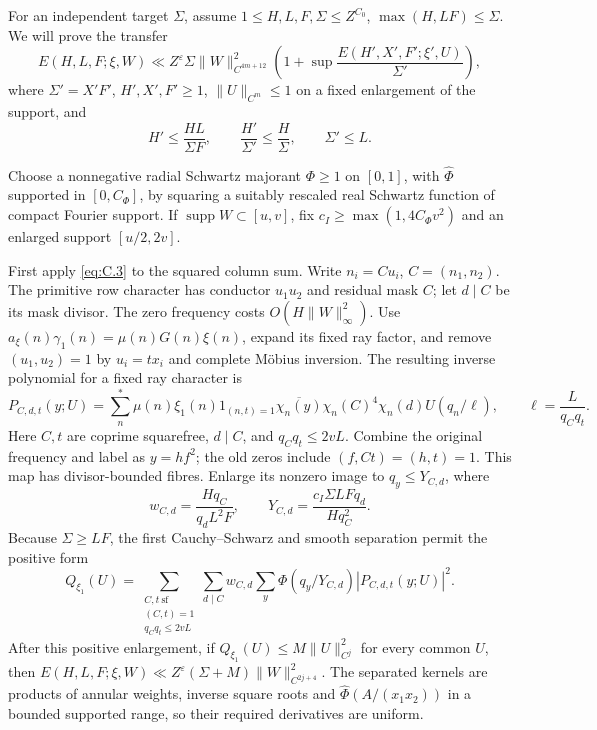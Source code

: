 \documentclass[11pt,a4paper]{article}
\begin{document}
For an independent target \(\Sigma\), assume \(1\le H,L,F,\Sigma\le Z^{C_0}\), \(\max(H,LF)\le\Sigma\). We will prove the transfer \[
E(H,L,F;\xi,W)
\ll Z^\varepsilon\Sigma\|W\|_{C^{4m+12}}^2
\left(1+\sup\frac{E(H',X',F';\xi',U)}{\Sigma'}\right),
\tag{C.8}\label{eq:C.8}
\] where \(\Sigma'=X'F'\), \(H',X',F'\ge1\), \(\|U\|_{C^m}\le1\) on a fixed enlargement of the support, and \[
H'\le\frac{HL}{\Sigma F},\qquad
\frac{H'}{\Sigma'}\le\frac H\Sigma,\qquad \Sigma'\le L.
\tag{C.9}\label{eq:C.9}
\]

Choose a nonnegative radial Schwartz majorant \(\Phi\ge1\) on \([0,1]\), with \(\widehat\Phi\) supported in \([0,C_\Phi]\), by squaring a suitably rescaled real Schwartz function of compact Fourier support. If \(\operatorname{supp}W\subset[u,v]\), fix \(c_I\ge\max(1,4C_\Phi v^2)\) and an enlarged support \([u/2,2v]\).

First apply \eqref{eq:C.3} to the squared column sum. Write \(n_i=Cu_i\), \(C=(n_1,n_2)\). The primitive row character has conductor \(u_1u_2\) and residual mask \(C\); let \(d\mid C\) be its mask divisor. The zero frequency costs \(O(H\|W\|_\infty^2)\). Use \(a_\xi(n)\gamma_1(n)=\mu(n)G(n)\xi(n)\), expand its fixed ray factor, and remove \((u_1,u_2)=1\) by \(u_i=tx_i\) and complete Möbius inversion. The resulting inverse polynomial for a fixed ray character is \[
P_{C,d,t}(y;U)=\sum_n^{*}\mu(n)\xi_1(n)1_{(n,t)=1}
\overline{\chi_n(y)}\chi_n(C)^4\chi_n(d)U(q_n/\ell),
\qquad \ell=\frac L{q_Cq_t}.
\tag{C.10}\label{eq:C.10}
\] Here \(C,t\) are coprime squarefree, \(d\mid C\), and \(q_Cq_t\le2vL\). Combine the original frequency and label as \(y=hf^2\); the old zeros include \((f,Ct)=(h,t)=1\). This map has divisor-bounded fibres. Enlarge its nonzero image to \(q_y\le Y_{C,d}\), where \[
w_{C,d}=\frac{Hq_C}{q_dL^2F},\qquad
Y_{C,d}=\frac{c_I\Sigma LFq_d}{Hq_C^2}.
\] Because \(\Sigma\ge LF\), the first Cauchy--Schwarz and smooth separation permit the positive form \[
Q_{\xi_1}(U)=
\sum_{\substack{C,t\ \mathrm{sf}\\(C,t)=1\\q_Cq_t\le2vL}}
\sum_{d\mid C}w_{C,d}\sum_y\Phi(q_y/Y_{C,d})|P_{C,d,t}(y;U)|^2.
\tag{C.11}\label{eq:C.11}
\] After this positive enlargement, if \(Q_{\xi_1}(U)\le M\|U\|_{C^j}^2\) for every common \(U\), then \(E(H,L,F;\xi,W)\ll Z^\varepsilon(\Sigma+M)\|W\|_{C^{2j+4}}^2\). The separated kernels are products of annular weights, inverse square roots and \(\widehat\Phi(A/(x_1x_2))\) in a bounded supported range, so their required derivatives are uniform.
\end{document}
